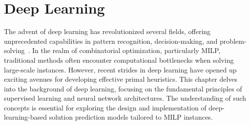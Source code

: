 

\chapter{Deep Learning}\label{chap:deep-learning}

The advent of deep learning has revolutionized several fields, offering unprecedented capabilities in pattern recognition, decision-making, and problem-solving~\cite{Goodfellow-et-al-2016}.
In the realm of combinatorial optimization, particularly MILP, traditional methods often encounter computational bottlenecks when solving large-scale instances.
However, recent strides in deep learning have opened up exciting avenues for developing effective primal heuristics.
This chapter delves into the background of deep learning, focusing on the fundamental principles of supervised learning and neural network architectures.
The understanding of such concepts is essential for exploring the design and implementation of deep-learning-based solution prediction models tailored to MILP instances.


